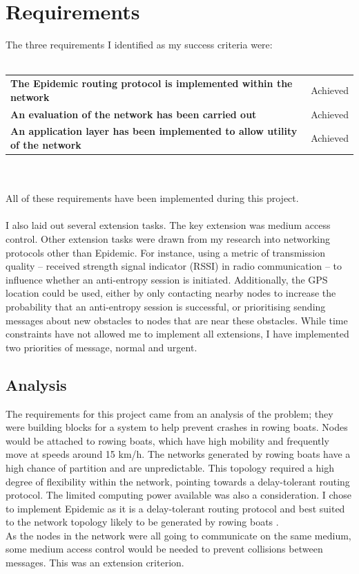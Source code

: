\documentclass[12pt,a4paper]{report}
\begin{document}
\section{Requirements}
The three requirements I identified as my success criteria were: \\ \\
\begin{tabular}{ll}
\textbf{The Epidemic routing protocol is implemented within the network}    & Achieved \\
\textbf{An evaluation of the network has been carried out}   & Achieved \\
\textbf{An application layer has been implemented to allow utility of the network}  & Achieved \\
\end{tabular} \\ \\
All of these requirements have been implemented during this project. \\ \\ 
I also laid out several extension tasks. The key extension was medium access control. Other extension tasks were drawn from my research into networking protocols other than Epidemic. For instance, using a metric of transmission quality -- received strength signal indicator (RSSI) in radio communication -- to influence whether an anti-entropy session is initiated. Additionally, the GPS location could be used, either by only contacting nearby nodes to increase the probability that an anti-entropy session is successful, or prioritising sending messages about new obstacles to nodes that are near these obstacles. While time constraints have not allowed me to implement all extensions, I have implemented two priorities of message, normal and urgent. \\

\subsection{Analysis}
The requirements for this project came from an analysis of the problem; they were building blocks for a system to help prevent crashes in rowing boats. Nodes would be attached to rowing boats, which have high mobility and frequently move at speeds around 15 km/h. The networks generated by rowing boats have a high chance of partition and are unpredictable. This topology required a high degree of flexibility within the network, pointing towards a delay-tolerant routing protocol. The limited computing power available was also a consideration. I chose to implement Epidemic as it is a delay-tolerant routing protocol and best suited to the network topology likely to be generated by rowing boats \cite{epidemic}. \\
As the nodes in the network were all going to communicate on the same medium, some medium access control would be needed to prevent collisions between messages. This was an extension criterion. \\
\end{document}
